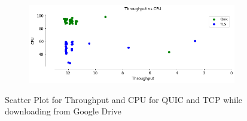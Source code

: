\begin{frame}

\begin{figure}[!htb]
    \centering
    \begin{subfigure}{0.5\textwidth}
        \includegraphics[width=\linewidth]{./plots/PI/throughputvscpu/ThroughputvsCPU.png}
    \end{subfigure}
    
    \caption{Scatter Plot for Throughput and CPU for QUIC and TCP while downloading from Google Drive}\label{fig:scatter-plot-for}
\end{figure}

\end{frame}
\clearpage

